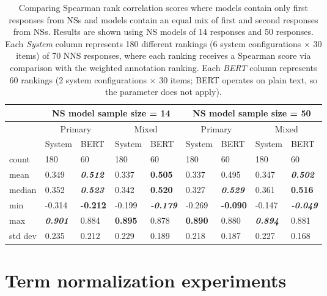 \begin{table}[htb!]
\begin{center}
\begin{tabular}{|l||l|l||l|l||l|l||l|l|}
\hline
 & \multicolumn{4}{c||}{NS model sample size = 14} & \multicolumn{4}{c|}{NS model sample size = 50} \\
 \hline
 & \multicolumn{2}{c||}{Primary} & \multicolumn{2}{c||}{Mixed} & \multicolumn{2}{c||}{Primary} & \multicolumn{2}{c|}{Mixed} \\
\hline
		& System & BERT 	& System 	& BERT 						& System & BERT 	& System & BERT \\
\hline
\hline
count 	& 180 	& 60 		& 180 		& 60 						& 180 	& 60 		& 180 & 60 \\
\hline
mean 	& 0.349 & \textit{\textbf{0.512}} & 0.337 & \textbf{0.505} 	& 0.337 & 0.495 	& 0.347 & \textit{\textbf{0.502}} \\
\hline
median 	& 0.352 & \textit{\textbf{0.523}} & 0.342 & \textbf{0.520}  & 0.327 & \textit{\textbf{0.529}} 	& 0.361 & \textbf{0.516}  \\
\hline
min & -0.314 & \textbf{-0.212} & -0.199 & \textit{\textbf{-0.179}}  & -0.269 & \textbf{-0.090} 	& -0.147 & \textit{\textbf{-0.049}}  \\
\hline
max & \textit{\textbf{0.901}} & 0.884 & \textbf{0.895} & 0.878 		& \textbf{0.890} & 0.880 	& \textit{\textbf{0.894}} & 0.881 \\
\hline
std dev & 0.235 & 0.212 	& 0.229 	& 0.189 					& 0.218 & 0.187 	& 0.227 & 0.168 \\
\hline
\end{tabular}
\caption{\label{tab:primacy-results} Comparing Spearman rank correlation scores where  models contain only first responses from NSs and  models contain an equal mix of first and second responses from NSs. Results are shown using NS models of 14 responses and 50 responses. Each \textit{System} column represents 180 different rankings (6 system configurations $\times$ 30 items) of 70 NNS responses, where each ranking receives a Spearman score via comparison with the weighted annotation ranking. Each \textit{BERT} column represents 60 rankings (2 system configurations $\times$ 30 items; BERT operates on plain text, so the  parameter does not apply).}
\end{center}
\end{table}


\section{Term normalization experiments}
\label{sec:exp-term-norm}

